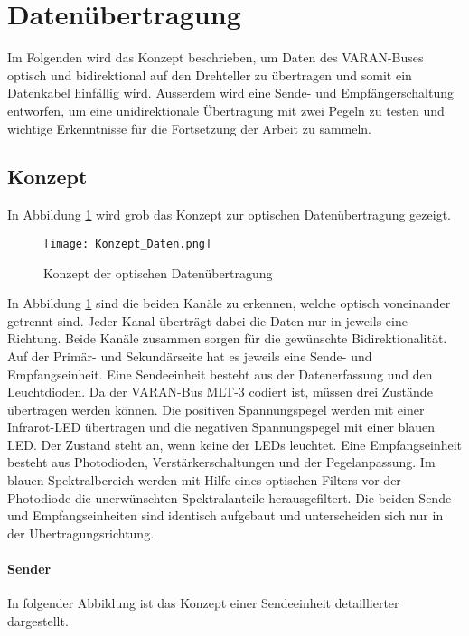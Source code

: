 \section{Datenübertragung}
\label{sec:Daten}
Im Folgenden wird das Konzept beschrieben, um Daten des VARAN-Buses optisch und bidirektional auf den Drehteller zu übertragen und somit ein Datenkabel hinfällig wird. Ausserdem wird eine Sende- und Empfängerschaltung entworfen, um eine unidirektionale Übertragung mit zwei Pegeln zu testen und wichtige Erkenntnisse für die Fortsetzung der Arbeit zu sammeln.  
\subsection{Konzept}
In Abbildung \ref{fig:Konzept_Daten} wird grob das Konzept zur optischen Datenübertragung gezeigt.

\begin{figure}[h]
	\centering
	\texttt{[image: Konzept\_Daten.png]}
	\caption{Konzept der optischen Datenübertragung}\label{fig:Konzept_Daten}
\end{figure}

In Abbildung \ref{fig:Konzept_Daten} sind die beiden Kanäle zu erkennen, welche optisch voneinander getrennt sind. Jeder Kanal überträgt dabei die Daten nur in jeweils eine Richtung. Beide Kanäle zusammen sorgen für die gewünschte Bidirektionalität. Auf der Primär- und Sekundärseite hat es jeweils eine Sende- und Empfangseinheit. Eine Sendeeinheit besteht aus der Datenerfassung und den Leuchtdioden. 
\newline
Da der VARAN-Bus MLT-3 codiert ist, müssen drei Zustände übertragen werden können. Die positiven Spannungspegel werden mit einer Infrarot-LED übertragen und die negativen Spannungspegel mit einer blauen LED. Der Zustand \grqq steht an, wenn keine der LEDs leuchtet.
\newline
Eine Empfangseinheit besteht aus Photodioden, Verstärkerschaltungen und der Pegelanpassung. Im blauen Spektralbereich werden mit Hilfe eines optischen Filters vor der Photodiode die unerwünschten Spektralanteile herausgefiltert.
\newline Die beiden Sende- und Empfangseinheiten sind identisch aufgebaut und unterscheiden sich nur in der Übertragungsrichtung.

\paragraph{Sender}
In folgender Abbildung ist das Konzept einer Sendeeinheit detaillierter dargestellt.


